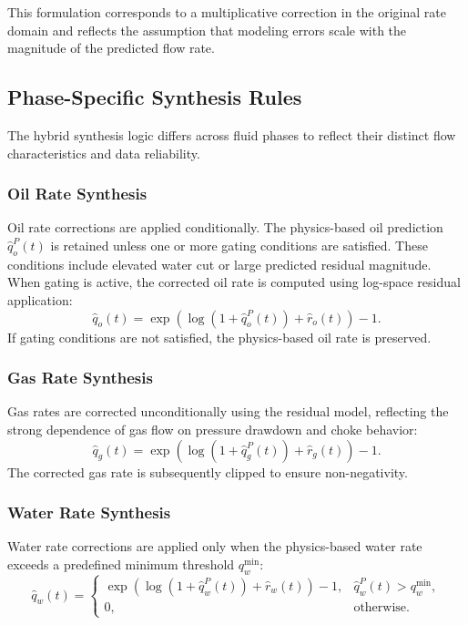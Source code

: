 \documentclass[12pt,APA]{uomthesis}
\begin{document}
This formulation corresponds to a multiplicative correction \citep{box1964analysis} in the original rate
domain and reflects the assumption that modeling errors scale with the magnitude of the predicted flow rate.

\subsection{Phase-Specific Synthesis Rules}
The hybrid synthesis logic differs across fluid phases to reflect their distinct
flow characteristics and data reliability.

\subsubsection{Oil Rate Synthesis}

Oil rate corrections are applied conditionally. The physics-based oil prediction
$\hat{q}_o^{P}(t)$ is retained unless one or more gating conditions are satisfied.
These conditions include elevated water cut or large predicted residual magnitude.
When gating is active, the corrected oil rate is computed using log-space residual
application:
\begin{equation}
\hat{q}_o(t)
=
\exp\!\left(
\log\!\left(1 + \hat{q}_o^{P}(t)\right) + \hat{r}_o(t)
\right) - 1.
\end{equation}
If gating conditions are not satisfied, the physics-based oil rate is preserved.

\subsubsection{Gas Rate Synthesis}

Gas rates are corrected unconditionally using the residual model, reflecting the
strong dependence of gas flow on pressure drawdown and choke behavior:
\begin{equation}
\hat{q}_g(t)
=
\exp\!\left(
\log\!\left(1 + \hat{q}_g^{P}(t)\right) + \hat{r}_g(t)
\right) - 1.
\end{equation}
The corrected gas rate is subsequently clipped to ensure non-negativity.

\subsubsection{Water Rate Synthesis}

Water rate corrections are applied only when the physics-based water rate exceeds
a predefined minimum threshold $q_w^{\min}$:
\begin{equation}
\hat{q}_w(t)
=
\begin{cases}
\exp\!\left(
\log\!\left(1 + \hat{q}_w^{P}(t)\right) + \hat{r}_w(t)
\right) - 1,
& \hat{q}_w^{P}(t) > q_w^{\min}, \\[6pt]
0,
& \text{otherwise}.
\end{cases}
\end{equation}
\end{document}
